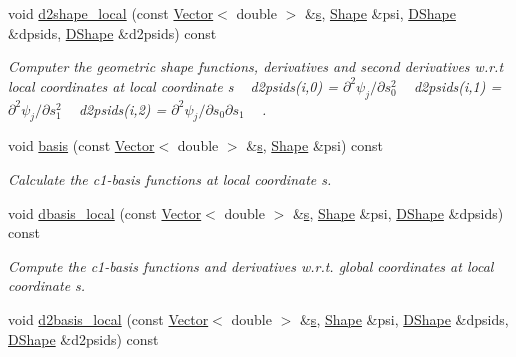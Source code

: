 \begin{DoxyCompactItemize}
void \hyperlink{classoomph_1_1BellElement_a60c49217f94a452387d83a521c681d01}{d2shape\+\_\+local} (const \hyperlink{classoomph_1_1Vector}{Vector}$<$ double $>$ \&\hyperlink{cfortran_8h_ab7123126e4885ef647dd9c6e3807a21c}{s}, \hyperlink{classoomph_1_1Shape}{Shape} \&psi, \hyperlink{classoomph_1_1DShape}{D\+Shape} \&dpsids, \hyperlink{classoomph_1_1DShape}{D\+Shape} \&d2psids) const
\begin{DoxyCompactList}\small\item\em Computer the geometric shape functions, derivatives and second derivatives w.\+r.\+t local coordinates at local coordinate s ~\newline
d2psids(i,0) = $ \partial^2 \psi_j / \partial s_0^2 $ ~\newline
d2psids(i,1) = $ \partial^2 \psi_j / \partial s_1^2 $ ~\newline
d2psids(i,2) = $ \partial^2 \psi_j / \partial s_0 \partial s_1 $ ~\newline
. \end{DoxyCompactList}\item 
void \hyperlink{classoomph_1_1BellElement_a31a6dfd140d030104094a333d4331dbc}{basis} (const \hyperlink{classoomph_1_1Vector}{Vector}$<$ double $>$ \&\hyperlink{cfortran_8h_ab7123126e4885ef647dd9c6e3807a21c}{s}, \hyperlink{classoomph_1_1Shape}{Shape} \&psi) const
\begin{DoxyCompactList}\small\item\em Calculate the c1-\/basis functions at local coordinate s. \end{DoxyCompactList}\item 
void \hyperlink{classoomph_1_1BellElement_aeeceae57e24c50d838e993fd92c8bc68}{dbasis\+\_\+local} (const \hyperlink{classoomph_1_1Vector}{Vector}$<$ double $>$ \&\hyperlink{cfortran_8h_ab7123126e4885ef647dd9c6e3807a21c}{s}, \hyperlink{classoomph_1_1Shape}{Shape} \&psi, \hyperlink{classoomph_1_1DShape}{D\+Shape} \&dpsids) const
\begin{DoxyCompactList}\small\item\em Compute the c1-\/basis functions and derivatives w.\+r.\+t. global coordinates at local coordinate s. \end{DoxyCompactList}\item 
void \hyperlink{classoomph_1_1BellElement_a58254e48913aa6428db33338b010a911}{d2basis\+\_\+local} (const \hyperlink{classoomph_1_1Vector}{Vector}$<$ double $>$ \&\hyperlink{cfortran_8h_ab7123126e4885ef647dd9c6e3807a21c}{s}, \hyperlink{classoomph_1_1Shape}{Shape} \&psi, \hyperlink{classoomph_1_1DShape}{D\+Shape} \&dpsids, \hyperlink{classoomph_1_1DShape}{D\+Shape} \&d2psids) const

\end{DoxyCompactItemize}
